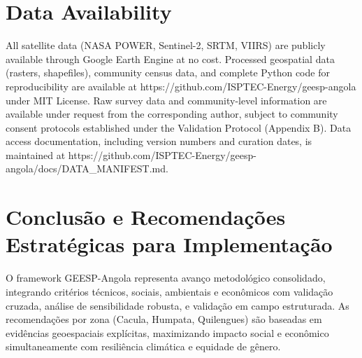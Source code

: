\documentclass[12pt, a4paper]{article}
\begin{document}
\section*{Data Availability}
All satellite data (NASA POWER, Sentinel-2, SRTM, VIIRS) are publicly available through Google Earth Engine at no cost. Processed geospatial data (rasters, shapefiles), community census data, and complete Python code for reproducibility are available at https://github.com/ISPTEC-Energy/geesp-angola under MIT License. Raw survey data and community-level information are available under request from the corresponding author, subject to community consent protocols established under the Validation Protocol (Appendix B). Data access documentation, including version numbers and curation dates, is maintained at https://github.com/ISPTEC-Energy/geesp-angola/docs/DATA\_MANIFEST.md.

\section{Conclusão e Recomendações Estratégicas para Implementação}

O framework GEESP-Angola representa avanço metodológico consolidado, integrando critérios técnicos, sociais, ambientais e econômicos com validação cruzada, análise de sensibilidade robusta, e validação em campo estruturada. As recomendações por zona (Cacula, Humpata, Quilengues) são baseadas em evidências geoespaciais explícitas, maximizando impacto social e econômico simultaneamente com resiliência climática e equidade de gênero.
\end{document}
